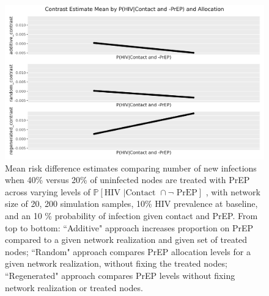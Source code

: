 \documentclass{article}
\theoremstyle{definition}
\begin{document}
\begin{figure}[H]
    \centering
    \includegraphics[width=\linewidth]{Corrected Figures/p1 Mean plots.png}
    \caption{Mean risk difference estimates comparing number of new infections when 40\% versus 20\% of uninfected nodes are treated with PrEP across varying levels of  $\mathbb{P}\left[\text{HIV } \vert \text {Contact } \cap \neg \text{ PrEP}\right]$ , with network size of 20,  200 simulation samples,  10\% HIV prevalence at baseline, and an 10 \% probability of infection given contact and PrEP.
    From top to bottom: ``Additive" approach increases proportion on PrEP compared to a given network realization and given set of treated nodes; ``Random" approach compares PrEP allocation levels for a given network realization, without fixing the treated nodes; ``Regenerated" approach compares PrEP levels without fixing network realization or treated nodes.}
    \label{fig:Figure 11}
\end{figure}
\end{document}
